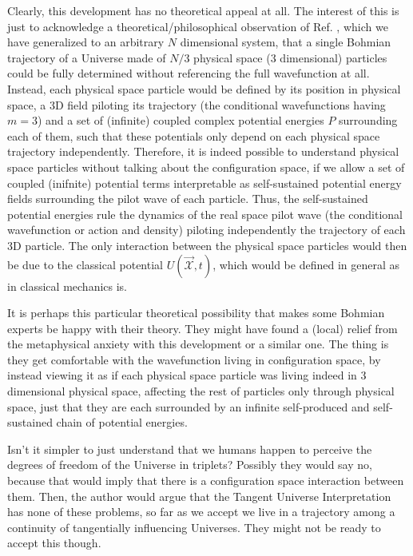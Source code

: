 \documentclass[11pt, a4paper]{article} %
\newcommand{\x}{\mathcal{X}}
\begin{document}
Clearly, this development has no theoretical appeal at all. The interest of this is just to acknowledge a theoretical/philosophical observation of Ref. \cite{Norse}, which we have generalized to an arbitrary $N$ dimensional system, that a single Bohmian trajectory of a Universe made of $N/3$ physical space (3 dimensional) particles could be fully determined without referencing the full wavefunction at all. Instead, each physical space particle would be defined by its position in physical space, a 3D field piloting its trajectory (the conditional wavefunctions having $m=3$) and a set of (infinite) coupled complex potential energies $P$ surrounding each of them, such that these potentials only depend on each physical space trajectory independently. Therefore, it is indeed possible to understand physical space particles without talking about the configuration space, if we allow a set of coupled (inifnite) potential terms interpretable as self-sustained potential energy fields surrounding the pilot wave of each particle. Thus, the self-sustained potential energies rule the dynamics of the real space pilot wave (the conditional wavefunction or action and density) piloting independently the trajectory of each 3D particle. The only interaction between the physical space particles would then be due to the classical potential $U(\vec{\x},t)$, which would be defined in general as in classical mechanics is.

It is perhaps this particular theoretical possibility that makes some Bohmian experts be happy with their theory. They might have found a (local) relief from the metaphysical anxiety with this development or a similar one. The thing is they get comfortable with the wavefunction living in configuration space, by instead viewing it as if each physical space particle was living indeed in 3 dimensional physical space, affecting the rest of particles only through physical space, just that they are each surrounded by an infinite self-produced and self-sustained chain of potential energies.

Isn't it simpler to just understand that we humans happen to perceive the degrees of freedom of the Universe in triplets? Possibly they would say no, because that would imply that there is a configuration space interaction between them. Then, the author would argue that the Tangent Universe Interpretation has none of these problems, so far as we accept we live in a trajectory among a continuity of tangentially influencing Universes. They might not be ready to accept this though.
\end{document}

